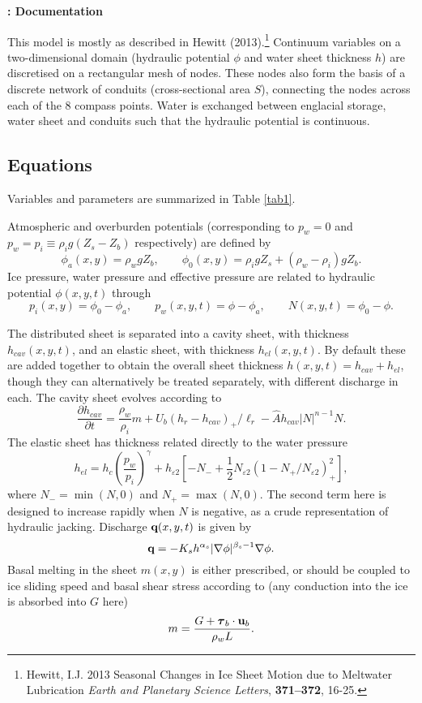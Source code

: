 \documentclass[a4paper,11pt,fleqn]{article}
\title{}
\author{I J Hewitt}
\date{\today}
\newcommand{\be}{\begin{equation} }
\newcommand{\ee}{\end{equation}}
\newcommand{\eps}{\varepsilon}
\newcommand{\pd}[2]{\frac{\partial #1}{\partial #2}}
\newcommand{\bm}[1]{\mbox{\boldmath$ #1 $}}
\newcommand{\bo}[1]{\mbox{\bf #1}}
\newcommand{\half}{\mbox{$\frac{1}{2}$}}
\begin{document}
\thispagestyle{first}

{\setlength{\parskip}{-5pt}
{\Large \bf {}: Documentation
} \setlength{\parskip}{5pt}

{This model is mostly as described in Hewitt (2013).\footnote{Hewitt, I.J. 2013 Seasonal Changes in Ice Sheet Motion due to Meltwater Lubrication {\it Earth and Planetary Science Letters}, {\bf 371--372}, 16-25.}  Continuum variables on a two-dimensional domain (hydraulic potential $\phi$ and water sheet thickness $h$) are discretised on a rectangular mesh of nodes.  These nodes also form the basis of a discrete network of conduits (cross-sectional area $S$), connecting the nodes across each of the 8 compass points.  Water is exchanged between englacial storage, water sheet and conduits such that the hydraulic potential is continuous.  

\subsection*{Equations}

Variables and parameters are summarized in Table \ref{tab1}. 

Atmospheric and overburden potentials (corresponding to $p_w=0$ and $p_w = p_i \equiv \rho_i g (Z_s-Z_b)$ respectively) are defined by
\be
\phi_a(x,y) = \rho_w g Z_b, \qquad
\phi_0(x,y) = \rho_i g Z_s + (\rho_w-\rho_i) g Z_b.
\ee
Ice pressure, water pressure and effective pressure are related to hydraulic potential $\phi(x,y,t)$ through
\be
p_i(x,y) = \phi_0 - \phi_a, \qquad 
p_w(x,y,t) = \phi - \phi_a, \qquad 
N(x,y,t) = \phi_0 - \phi.
\ee


The distributed sheet is separated into a cavity sheet, with thickness $h_{cav}(x,y,t)$, and an elastic sheet, with thickness $h_{el}(x,y,t)$. By default these are added together to obtain the overall sheet thickness $h(x,y,t) = h_{cav} + h_{el}$, though they can alternatively be treated separately, with different discharge in each. The cavity sheet evolves according to
\be
\pd{h_{cav}}{t} = \frac{\rho_w}{\rho_i} m + U_b(h_r - h_{cav})_+/\ell_r - \hat{A} h_{cav} |N|^{n-1} N.
\ee
The elastic sheet has thickness related directly to the water pressure
\be
h_{el} = h_c \left(\frac{p_w}{p_i}\right)^{\gamma} + h_{\eps 2} \left[ -N_- + \half N_{\eps 2} \left(1-N_+/N_{\eps 2}\right)_+^2 \right],
\ee
where $N_- = \min(N,0)$ and $N_+ = \max(N,0)$.  The second term here is designed to increase rapidly when $N$ is negative, as a crude representation of hydraulic jacking.  Discharge $\bo{q}(x,y,t)$ is given by
\be
{\bo q} = -K_s h^{\alpha_s} |\nabla \phi|^{\beta_s-1} \nabla \phi.
\ee
Basal melting in the sheet $m(x,y)$ is either prescribed, or should be coupled to ice sliding speed and basal shear stress according to (any conduction into the ice is absorbed into $G$ here)
\be
m =  \frac{G + {\bm \tau}_b\cdot{\bf u}_b}{\rho_w L}.
\ee


}}
\end{document}
